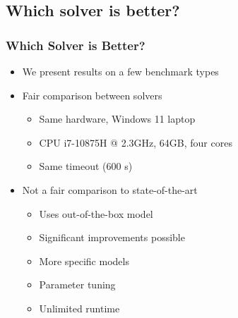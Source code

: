 \subsection{Which solver is better?}

\begin{frame}
\frametitle{Which Solver is Better?}
\begin{itemize}
\item We present results on a few benchmark types
\item Fair comparison between solvers
\begin{itemize}
\item Same hardware, Windows 11 laptop
\item CPU i7-10875H @ 2.3GHz, 64GB, four cores
\item Same timeout (600 s)
\end{itemize}
\item Not a fair comparison to state-of-the-art
\begin{itemize}
\item Uses out-of-the-box model
\item Significant improvements possible
\item More specific models
\item Parameter tuning
\item Unlimited runtime
\end{itemize}

\end{itemize}
\end{frame}

